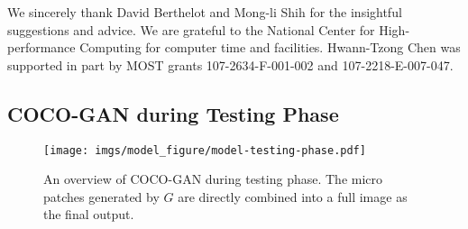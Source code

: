 \documentclass{article}
\newcommand{\modelName}{COCO-GAN }
\begin{document}
    We sincerely thank David Berthelot and Mong-li Shih for the insightful suggestions and advice. We are grateful to the National Center for High-performance Computing for computer time and facilities. Hwann-Tzong Chen was supported in part by MOST grants 107-2634-F-001-002 and 107-2218-E-007-047. 
\onecolumn
{}
\begin{appendices}

\section{\modelName during Testing Phase}
    \label{appendix:model-testing-phase}
    \begin{figure}[H]
        \centering
        \texttt{[image: imgs/model\_figure/model-testing-phase.pdf]}
        \caption{An overview of \modelName during testing phase. The micro patches generated by $G$ are directly combined into a full image as the final output.}
        \label{fig:model-testing-phase}
        \vspace{-1em}
    \end{figure}
    

\end{appendices}
\end{document}
